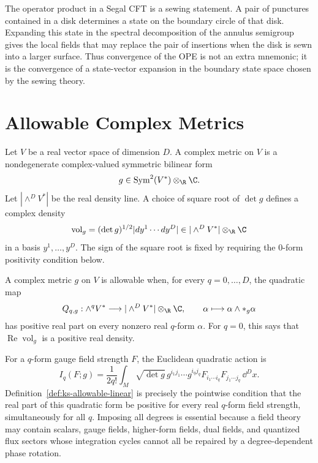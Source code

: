 The operator product in a Segal CFT is a sewing statement.  A pair of
punctures contained in a disk determines a state on the boundary circle of
that disk.  Expanding this state in the spectral decomposition of the annulus
semigroup gives the local fields that may replace the pair of insertions
when the disk is sewn into a larger surface.  Thus convergence of the OPE is
not an extra mnemonic; it is the convergence of a state-vector expansion in
the boundary state space chosen by the sewing theory.

\section{Allowable Complex Metrics}

Let \(V\) be a real vector space of dimension \(D\).  A complex metric on
\(V\) is a nondegenerate complex-valued symmetric bilinear form
\[
  g\in\operatorname{Sym}^2(V^*)\otimes_{\R}\C .
\]
Let \(|\wedge^D V^*|\) be the real density line.  A choice of square root of
\(\det g\) defines a complex density
\[
  \operatorname{vol}_g=(\det g)^{1/2}|dy^1\cdots dy^D|
  \in |\wedge^D V^*|\otimes_{\R}\C
\]
in a basis \(y^1,\ldots,y^D\).  The sign of the square root is fixed by
requiring the \(0\)-form positivity condition below.

\begin{definition}
\label{def:ks-allowable-linear}
A complex metric \(g\) on \(V\) is allowable when, for every
\(q=0,\ldots,D\), the quadratic map
\[
  Q_{q,g}:\wedge^q V^*\longrightarrow |\wedge^D V^*|\otimes_{\R}\C,
  \qquad
  \alpha\longmapsto \alpha\wedge *_g\alpha
\]
has positive real part on every nonzero real \(q\)-form \(\alpha\).  For
\(q=0\), this says that \(\operatorname{Re}\operatorname{vol}_g\) is a
positive real density.
\end{definition}

For a \(q\)-form gauge field strength \(F\), the Euclidean quadratic action is
\[
  I_q(F;g)
  =
  \frac{1}{2q!}
  \int_M
  \sqrt{\det g}\,
  g^{i_1j_1}\cdots g^{i_qj_q}
  F_{i_1\cdots i_q}F_{j_1\cdots j_q}\,\dd^Dx .
\]
Definition~\ref{def:ks-allowable-linear} is precisely the pointwise
condition that the real part of this quadratic form be positive for every
real \(q\)-form field strength, simultaneously for all \(q\).  Imposing all
degrees is essential because a field theory may contain scalars, gauge
fields, higher-form fields, dual fields, and quantized flux sectors whose
integration cycles cannot all be repaired by a degree-dependent phase
rotation.

